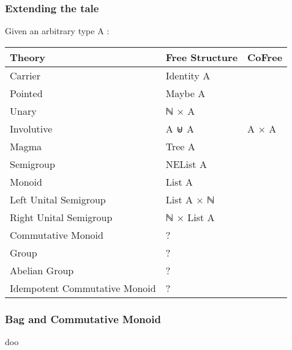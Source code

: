 \documentclass[serif,mathserif,professionalfont,10pt]{beamer}
\begin{document}
\begin{frame}
\frametitle{Extending the tale}
Given an arbitrary type A : \\ \vspace*{4mm}
\begin{tabular}{lll}
\textbf{Theory} & Free \textbf{Structure} & CoFree \\ \hline
Carrier & Identity A & \\
Pointed & Maybe A & \\ \hline
Unary & ℕ × A &  \\
Involutive & A ⊎ A & A × A \\ \hline
Magma & Tree A &  \\
Semigroup & NEList A & \\ \hline
Monoid & List A & \\
Left Unital Semigroup & List A × ℕ & \\
Right Unital Semigroup & ℕ × List A & \\ \hline
Commutative Monoid & ? & \\
Group & ? & \\
Abelian Group & ? & \\
Idempotent Commutative Monoid & ? & \\
\end{tabular}
\end{frame}

\begin{frame}
\frametitle{Bag and Commutative Monoid}
\begin{definition}
doo
\end{definition}
\end{frame}
\end{document}
